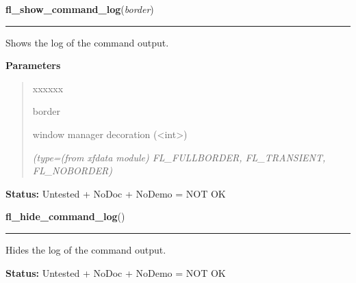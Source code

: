     \label{xformslib:library:fl_show_command_log}

    \vspace{0.5ex}

\hspace{.8\funcindent}\begin{boxedminipage}{\funcwidth}

    \raggedright \textbf{fl\_show\_command\_log}(\textit{border})

    \vspace{-1.5ex}

    \rule{\textwidth}{0.5\fboxrule}
\setlength{\parskip}{2ex}
    Shows the log of the command output.

\setlength{\parskip}{1ex}
      \textbf{Parameters}
      \vspace{-1ex}

      \begin{quote}
        \begin{Ventry}{xxxxxx}

          \item[border]

          window manager decoration ({\textless}int{\textgreater})

            {\it (type=(from xfdata module) FL\_FULLBORDER, FL\_TRANSIENT, FL\_NOBORDER)}

        \end{Ventry}

      \end{quote}

\textbf{Status:} Untested + NoDoc + NoDemo = NOT OK



    \end{boxedminipage}

    \label{xformslib:library:fl_hide_command_log}

    \vspace{0.5ex}

\hspace{.8\funcindent}\begin{boxedminipage}{\funcwidth}

    \raggedright \textbf{fl\_hide\_command\_log}()

    \vspace{-1.5ex}

    \rule{\textwidth}{0.5\fboxrule}
\setlength{\parskip}{2ex}
    Hides the log of the command output.

\setlength{\parskip}{1ex}
\textbf{Status:} Untested + NoDoc + NoDemo = NOT OK



    \end{boxedminipage}

